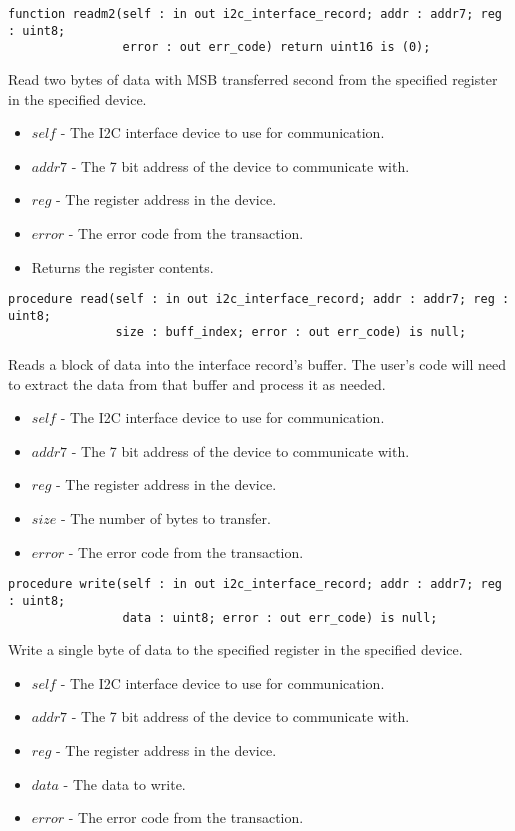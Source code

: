 \documentclass[10pt, openany]{book}
\newcommand{\indexfunc}[1]{\index[func]{#1}}
\begin{document}
\begin{lstlisting}
function readm2(self : in out i2c_interface_record; addr : addr7; reg : uint8;
                error : out err_code) return uint16 is (0);
\end{lstlisting}
\indexfunc{readm2}
Read two bytes of data with MSB transferred second from the specified register in the specified device.
\begin{itemize}
  \item $self$ - The I2C interface device to use for communication.
  \item $addr7$ - The 7 bit address of the device to communicate with.
  \item $reg$ - The register address in the device.
  \item $error$ - The error code from the transaction.
  \item Returns the register contents.
\end{itemize}

\begin{lstlisting}
procedure read(self : in out i2c_interface_record; addr : addr7; reg : uint8;
               size : buff_index; error : out err_code) is null;
\end{lstlisting}
\indexfunc{read}
Reads a block of data into the interface record's buffer.  The user's code will need to extract the data from that buffer and process it as needed.
\begin{itemize}
  \item $self$ - The I2C interface device to use for communication.
  \item $addr7$ - The 7 bit address of the device to communicate with.
  \item $reg$ - The register address in the device.
  \item $size$ - The number of bytes to transfer.
  \item $error$ - The error code from the transaction.
\end{itemize}

\begin{lstlisting}
procedure write(self : in out i2c_interface_record; addr : addr7; reg : uint8;
                data : uint8; error : out err_code) is null;
\end{lstlisting}
\indexfunc{write}
Write a single byte of data to the specified register in the specified device.
\begin{itemize}
  \item $self$ - The I2C interface device to use for communication.
  \item $addr7$ - The 7 bit address of the device to communicate with.
  \item $reg$ - The register address in the device.
  \item $data$ - The data to write.
  \item $error$ - The error code from the transaction.
\end{itemize}
\end{document}
